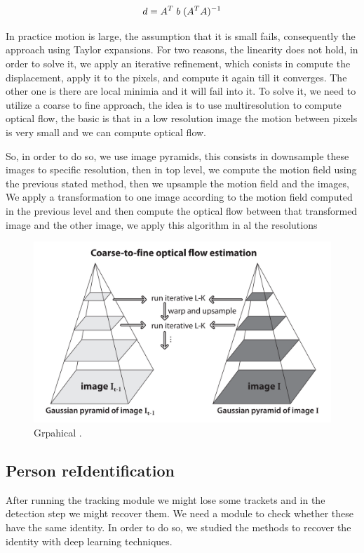 \documentclass[12pt, a4paper, titlepage,twoside,openright]{article}
\begin{document}
$$ d = A^{T} \hspace{0.1cm} b \hspace{0.1cm} (A^{T}A)^{-1} $$


In practice motion is large, the assumption that it is small fails, consequently the approach using Taylor expansions. For two reasons, the linearity does not hold, in order to solve it, we apply an iterative refinement, which conists in compute the displacement, apply it to the pixels, and compute it again till it converges. The other one is there are local minimia and it will fail into it. To solve it, we need to utilize a coarse to fine approach, the idea is to use multiresolution to compute optical flow, the basic is that in a low resolution image the motion between pixels is very small and we can compute optical flow.

So, in order to do so, we use image pyramids, this consists in downsample these images to specific resolution, then in top level, we compute the motion field using the previous stated method, then 
we upsample the motion field and the images, We apply a transformation to one image according to the motion field computed in the previous level and then compute the optical flow between that 
transformed image and the other image, we apply this algorithm in al the resolutions



\begin{figure}[H]
\centering         
\includegraphics[width=0.6\linewidth]{lucasKanade/piram.png}
\caption{Grpahical .} \label{corner}
\end{figure}



\subsection{Person reIdentification}\label{misMatch}


After running the tracking module we might lose some trackets and in the detection step we might recover them. We need a module to check whether these have the same identity. In order to do so, we studied the methods to recover the identity with deep learning techniques.
\end{document}
